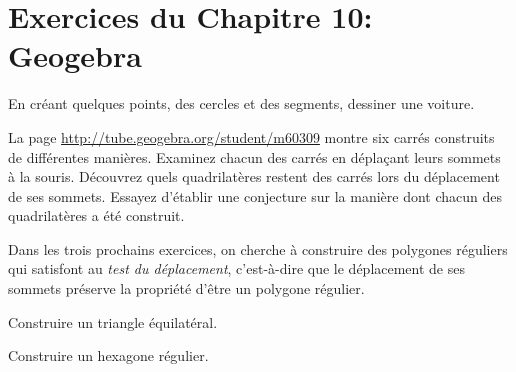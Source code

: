 
\section*{Exercices du Chapitre 10: Geogebra}


\begin{exercice}
En créant quelques points, des cercles et des segments, dessiner une voiture.
\end{exercice}

\begin{exercice}
La page \url{http://tube.geogebra.org/student/m60309} montre six carrés
construits de différentes manières.  Examinez chacun des carrés en déplaçant
leurs sommets à la souris. Découvrez quels quadrilatères restent des carrés lors
du déplacement de ses sommets. Essayez d'établir une conjecture sur la manière
dont chacun des quadrilatères a été construit.
\end{exercice}

Dans les trois prochains exercices, on cherche à construire des polygones
réguliers qui satisfont au \emph{test du déplacement}, c'est-à-dire que le
déplacement de ses sommets préserve la propriété d'être un polygone régulier.

\begin{exercice}
Construire un triangle équilatéral. 
\end{exercice}

\begin{exercice}
Construire un hexagone régulier.
\end{exercice}



